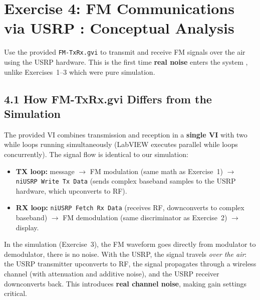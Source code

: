 \documentclass[../../main.tex]{subfiles}
\begin{document}
\newpage

\section{Exercise 4: FM Communications via USRP : Conceptual Analysis}

\begin{GoalBox}
Use the provided \texttt{FM-TxRx.gvi} to transmit and receive FM signals over the air using the USRP hardware. This is the first time \textbf{real noise} enters the system , unlike Exercises~1--3 which were pure simulation.
\end{GoalBox}

\vspace{1em}

\subsection{4.1 \; How FM-TxRx.gvi Differs from the Simulation}

The provided VI combines transmission and reception in a \textbf{single VI} with two while loops running simultaneously (LabVIEW executes parallel while loops concurrently). The signal flow is identical to our simulation:

\begin{itemize}[leftmargin=1.5em]
  \item \textbf{TX loop:} message $\to$ FM modulation (same math as Exercise~1) $\to$ \texttt{niUSRP Write Tx Data} (sends complex baseband samples to the USRP hardware, which upconverts to RF).
  \item \textbf{RX loop:} \texttt{niUSRP Fetch Rx Data} (receives RF, downconverts to complex baseband) $\to$ FM demodulation (same discriminator as Exercise~2) $\to$ display.
\end{itemize}

\begin{IntuitionBox}
In the simulation (Exercise~3), the FM waveform goes directly from modulator to demodulator, there is no noise. With the USRP, the signal travels \emph{over the air}: the USRP transmitter upconverts to RF, the signal propagates through a wireless channel (with attenuation and additive noise), and the USRP receiver downconverts back. This introduces \textbf{real channel noise}, making gain settings critical.
\end{IntuitionBox}

\vspace{1em}
\end{document}
